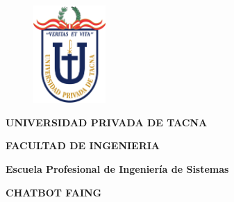 \documentclass[12pt]{report}
\begin{document}

\begin{figure}[H]
	\begin{Center}
		\includegraphics[width=1.09in,height=1.46in]{./media/image1.png}
	\end{Center}
\end{figure}



\setlength{\parskip}{0.0pt}
\par


\vspace{\baselineskip}
\begin{Center}
{\fontsize{18pt}{21.6pt}\selectfont \textbf{UNIVERSIDAD PRIVADA DE TACNA}\par}
\end{Center}\par


\vspace{\baselineskip}
\begin{Center}
{\fontsize{16pt}{19.2pt}\selectfont \textbf{FACULTAD DE INGENIERIA}\par}
\end{Center}\par

\begin{Center}
{\fontsize{16pt}{19.2pt}\selectfont \textbf{Escuela Profesional de Ingeniería de Sistemas}\par}
\end{Center}\par


\vspace{\baselineskip}

\vspace{\baselineskip}
\begin{Center}
{\fontsize{18pt}{21.6pt}\selectfont \textbf{CHATBOT FAING}\par}
\end{Center}\par
\end{document}
